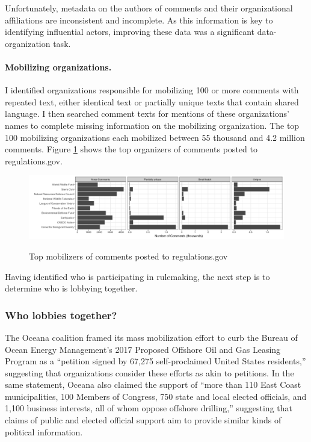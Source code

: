 Unfortunately, metadata on the authors of comments and their organizational affiliations are inconsistent and incomplete. As this information is key to identifying influential actors, improving these data was a significant data-organization task. 


\paragraph{Mobilizing organizations.} I identified organizations responsible for mobilizing 100 or more comments with repeated text, either identical text or partially unique texts that contain shared language. 
I then searched comment texts for mentions of these organizations' names to complete missing information on the mobilizing organization.
 The top 100 mobilizing organizations each mobilized between 55 thousand and 4.2 million comments. Figure \ref{fig:toporgs} shows the top organizers of comments posted to regulations.gov.

\begin{figure}[h!]
    \centering
        \caption{Top mobilizers of comments posted to regulations.gov}
    \includegraphics[width = 6.5in]{Figs/toporgs.png}
    \label{fig:toporgs}
\end{figure}

Having identified who is participating in rulemaking, the next step is to determine who is lobbying together.

\subsubsection{Who lobbies together?}
The Oceana coalition framed its mass mobilization effort to curb the  Bureau of Ocean Energy Management's 2017 Proposed Offshore Oil and Gas Leasing Program as a ``petition signed by 67,275 self-proclaimed United States residents,'' suggesting that organizations consider these efforts as akin to petitions. In the same statement, Oceana also claimed the support of ``more than 110 East Coast municipalities, 100 Members of Congress, 750 state and local elected officials, and 1,100 business interests, all of whom oppose offshore drilling,'' suggesting that claims of public and elected official support aim to provide similar kinds of political information. 



